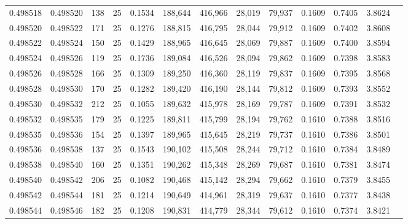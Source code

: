 \begin{tabular}{rrrrrrrrrrrrr}
0.498518 & 0.498520 & 138 &  25 &                                     0.1534 & 188,644 & 416,966 &  28,019 &  79,937 & 0.1609 & 0.7405 & 3.8624 \\
0.498520 & 0.498522 & 171 &  25 &                                     0.1276 & 188,815 & 416,795 &  28,044 &  79,912 & 0.1609 & 0.7402 & 3.8608 \\
0.498522 & 0.498524 & 150 &  25 &                                     0.1429 & 188,965 & 416,645 &  28,069 &  79,887 & 0.1609 & 0.7400 & 3.8594 \\
0.498524 & 0.498526 & 119 &  25 &                                     0.1736 & 189,084 & 416,526 &  28,094 &  79,862 & 0.1609 & 0.7398 & 3.8583 \\
0.498526 & 0.498528 & 166 &  25 &                                     0.1309 & 189,250 & 416,360 &  28,119 &  79,837 & 0.1609 & 0.7395 & 3.8568 \\
0.498528 & 0.498530 & 170 &  25 &                                     0.1282 & 189,420 & 416,190 &  28,144 &  79,812 & 0.1609 & 0.7393 & 3.8552 \\
0.498530 & 0.498532 & 212 &  25 &                                     0.1055 & 189,632 & 415,978 &  28,169 &  79,787 & 0.1609 & 0.7391 & 3.8532 \\
0.498532 & 0.498535 & 179 &  25 &                                     0.1225 & 189,811 & 415,799 &  28,194 &  79,762 & 0.1610 & 0.7388 & 3.8516 \\
0.498535 & 0.498536 & 154 &  25 &                                     0.1397 & 189,965 & 415,645 &  28,219 &  79,737 & 0.1610 & 0.7386 & 3.8501 \\
0.498536 & 0.498538 & 137 &  25 &                                     0.1543 & 190,102 & 415,508 &  28,244 &  79,712 & 0.1610 & 0.7384 & 3.8489 \\
0.498538 & 0.498540 & 160 &  25 &                                     0.1351 & 190,262 & 415,348 &  28,269 &  79,687 & 0.1610 & 0.7381 & 3.8474 \\
0.498540 & 0.498542 & 206 &  25 &                                     0.1082 & 190,468 & 415,142 &  28,294 &  79,662 & 0.1610 & 0.7379 & 3.8455 \\
0.498542 & 0.498544 & 181 &  25 &                                     0.1214 & 190,649 & 414,961 &  28,319 &  79,637 & 0.1610 & 0.7377 & 3.8438 \\
0.498544 & 0.498546 & 182 &  25 &                                     0.1208 & 190,831 & 414,779 &  28,344 &  79,612 & 0.1610 & 0.7374 & 3.8421 \\

\end{tabular}
